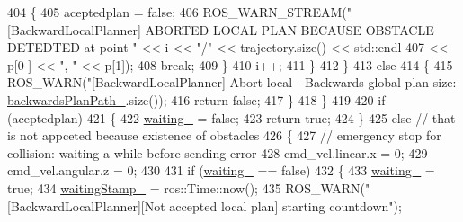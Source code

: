\begin{DoxyCode}
{{404                         \{
405                             aceptedplan = \textcolor{keyword}{false};
406                             ROS\_WARN\_STREAM(\textcolor{stringliteral}{"[BackwardLocalPlanner] ABORTED LOCAL PLAN BECAUSE OBSTACLE
       DETEDTED at point "} << i << \textcolor{stringliteral}{"/"} << trajectory.size() << std::endl
407                                                                                                      << p[0
      ] << \textcolor{stringliteral}{", "} << p[1]);
408                             \textcolor{keywordflow}{break};
409                         \}
410                         i++;
411                     \}
412                 \}
413                 \textcolor{keywordflow}{else}
414                 \{
415                     ROS\_WARN(\textcolor{stringliteral}{"[BackwardLocalPlanner] Abort local - Backwards global plan size: %
      \hyperlink{classcl__move__base__z_1_1backward__local__planner_1_1BackwardLocalPlanner_ad9cde5c85f782cab2ddb4030e3c3f2cf}{backwardsPlanPath\_}.size());
416                     \textcolor{keywordflow}{return} \textcolor{keyword}{false};
417                 \}
418             \}
419 
420             \textcolor{keywordflow}{if} (aceptedplan)
421             \{
422                 \hyperlink{classcl__move__base__z_1_1backward__local__planner_1_1BackwardLocalPlanner_a00849266e4bdd9379c3717e8a41c303e}{waiting\_} = \textcolor{keyword}{false};
423                 \textcolor{keywordflow}{return} \textcolor{keyword}{true};
424             \}
425             \textcolor{keywordflow}{else} \textcolor{comment}{// that is not appceted because existence of obstacles}
426             \{
427                 \textcolor{comment}{// emergency stop for collision: waiting a while before sending error}
428                 cmd\_vel.linear.x = 0;
429                 cmd\_vel.angular.z = 0;
430 
431                 \textcolor{keywordflow}{if} (\hyperlink{classcl__move__base__z_1_1backward__local__planner_1_1BackwardLocalPlanner_a00849266e4bdd9379c3717e8a41c303e}{waiting\_} == \textcolor{keyword}{false})
432                 \{
433                     \hyperlink{classcl__move__base__z_1_1backward__local__planner_1_1BackwardLocalPlanner_a00849266e4bdd9379c3717e8a41c303e}{waiting\_} = \textcolor{keyword}{true};
434                     \hyperlink{classcl__move__base__z_1_1backward__local__planner_1_1BackwardLocalPlanner_abe08faab5b784fcf64ac6b3f936459f1}{waitingStamp\_} = ros::Time::now();
435                     ROS\_WARN(\textcolor{stringliteral}{"[BackwardLocalPlanner][Not accepted local plan] starting countdown"});
}}}
\end{DoxyCode}
